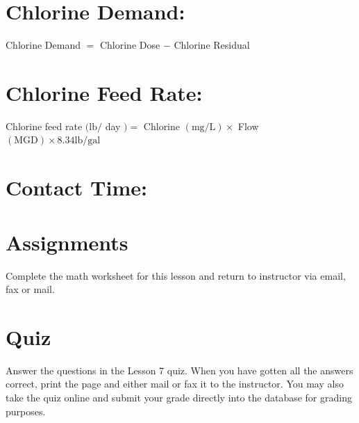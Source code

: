 \documentclass[10pt]{article}
\begin{document}
\section{Chlorine Demand:}
Chlorine Demand $=$ Chlorine Dose $-$ Chlorine Residual

\section{Chlorine Feed Rate:}
Chlorine feed rate $(\mathrm{lb} /$ day $)=$ Chlorine $(\mathrm{mg} / \mathrm{L}) \times$ Flow $(\mathrm{MGD}) \times 8.34 \mathrm{lb} / \mathrm{gal}$

\section{Contact Time:}
\section{Assignments}
Complete the math worksheet for this lesson and return to instructor via email, fax or mail.

\section{Quiz}
Answer the questions in the Lesson 7 quiz. When you have gotten all the answers correct, print the page and either mail or fax it to the instructor. You may also take the quiz online and submit your grade directly into the database for grading purposes.
\end{document}
